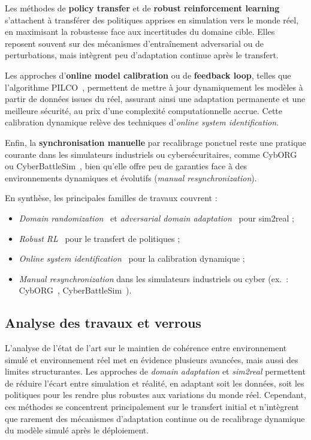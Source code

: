 Les méthodes de \textbf{policy transfer} et de \textbf{robust reinforcement learning}~\cite{pinto2017robust} s’attachent à transférer des politiques apprises en simulation vers le monde réel, en maximisant la robustesse face aux incertitudes du domaine cible. Elles reposent souvent sur des mécanismes d'entraînement adversarial ou de perturbations, mais intègrent peu d'adaptation continue après le transfert.

Les approches d’\textbf{online model calibration} ou de \textbf{feedback loop}, telles que l’algorithme PILCO~\cite{deisenroth2011pilco}, permettent de mettre à jour dynamiquement les modèles à partir de données issues du réel, assurant ainsi une adaptation permanente et une meilleure sécurité, au prix d’une complexité computationnelle accrue. Cette calibration dynamique relève des techniques d’\textit{online system identification}.

Enfin, la \textbf{synchronisation manuelle} par recalibrage ponctuel reste une pratique courante dans les simulateurs industriels ou cybersécuritaires, comme CybORG~\cite{Standen2021} ou CyberBattleSim~\cite{cyberbattlesim}, bien qu’elle offre peu de garanties face à des environnements dynamiques et évolutifs (\textit{manual resynchronization}).

\medskip

En synthèse, les principales familles de travaux couvrent :
\begin{itemize}
  \item \textit{Domain randomization}~\cite{tobin2017domain} et \textit{adversarial domain adaptation}~\cite{ganin2016domain} pour sim2real ;
  \item \textit{Robust RL}~\cite{pinto2017robust} pour le transfert de politiques ;
  \item \textit{Online system identification}~\cite{deisenroth2011pilco} pour la calibration dynamique ;
  \item \textit{Manual resynchronization} dans les simulateurs industriels ou cyber (ex.~: CybORG~\cite{Standen2021}, CyberBattleSim~\cite{cyberbattlesim}).
\end{itemize}


\subsection*{Analyse des travaux et verrous}

L’analyse de l’état de l’art sur le maintien de cohérence entre environnement simulé et environnement réel met en évidence plusieurs avancées, mais aussi des limites structurantes. Les approches de \textit{domain adaptation} et \textit{sim2real} permettent de réduire l’écart entre simulation et réalité, en adaptant soit les données, soit les politiques pour les rendre plus robustes aux variations du monde réel. Cependant, ces méthodes se concentrent principalement sur le transfert initial et n’intègrent que rarement des mécanismes d’adaptation continue ou de recalibrage dynamique du modèle simulé après le déploiement.

